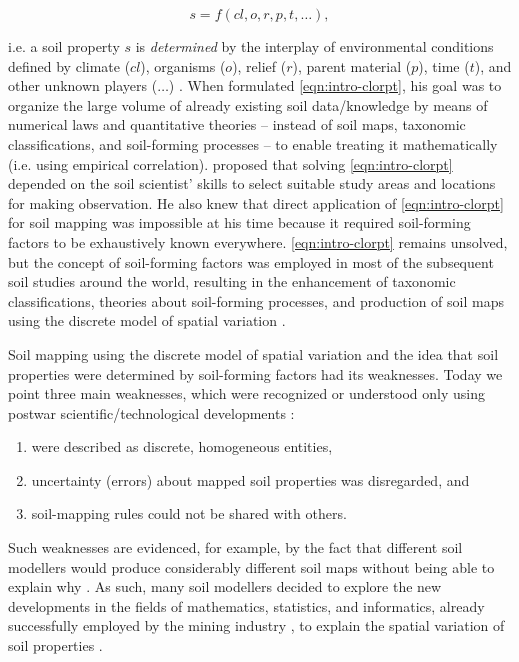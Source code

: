 \begin{equation}\label{eqn:intro-clorpt}
s = f(cl, o, r, p, t, \ldots),
\end{equation}

\noindent
i.e. a soil property $s$ is \emph{determined} by the interplay of environmental conditions defined
by climate ($cl$), organisms ($o$), relief ($r$), parent material ($p$), time ($t$), and other unknown
players ($\ldots$) \cite{Jenny1941}. When  formulated \autoref{eqn:intro-clorpt},
his goal was to organize the large volume of already existing soil data/knowledge by means of
numerical laws and quantitative theories -- instead of soil maps, taxonomic classifications, and
soil-forming processes -- to enable treating it mathematically (i.e. using empirical correlation).
 proposed that solving \autoref{eqn:intro-clorpt} depended on the soil scientist'
skills to select suitable study areas and locations for making observation. He also knew that direct
application of \autoref{eqn:intro-clorpt} for soil mapping was impossible at his time because it
required soil-forming factors to be exhaustively known everywhere. \autoref{eqn:intro-clorpt}
remains unsolved, but the concept of soil-forming factors was employed in most of the subsequent soil
studies around the world, resulting in the enhancement of taxonomic classifications, theories about
soil-forming processes, and production of soil maps using the discrete model of spatial variation
\cite{Schelling1970, Hudson1992, BockheimEtAl2000, Legros2006, KrasilnikovEtAl2009b, HarteminkEtAl2013}.

Soil mapping using the discrete model of spatial variation and the idea that soil properties were
determined by soil-forming factors had its weaknesses. Today we point three main weaknesses, which
were recognized or understood only using postwar scientific/technological developments
\cite{HeuvelinkEtAl2001, McBratneyEtAl2003, ScullEtAl2003}:

\begin{enumerate}
\item {} were described as discrete, homogeneous entities,
\item uncertainty (errors) about mapped soil properties was disregarded, and
\item soil-mapping rules could not be shared with others.
\end{enumerate}

\noindent
Such weaknesses are evidenced, for example, by the fact that different soil modellers would produce 
considerably different soil maps without being able to explain why \cite{Legros2006, BazagliaFilhoEtAl2013}. As 
such, many soil modellers decided to explore the new developments in the fields of mathematics, statistics, and 
informatics, already successfully employed by the mining industry \cite{Matheron1969}, to explain the spatial 
variation of soil properties \cite{WebsterEtAl1990}.

